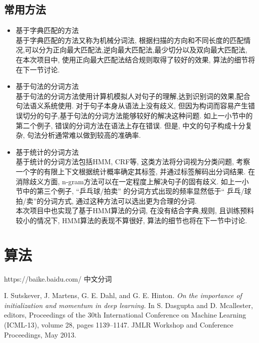 \documentclass[titlepage]{article}
\begin{document}
\subsection{常用方法}
\begin{itemize}
\item 基于字典匹配的方法\\[1em]
  基于字典匹配的方法又称为机械分词法, 根据扫描的方向和不同长度的匹配情况,可以分为正向最大匹配法,逆向最大匹配法,最少切分以及双向最大匹配法, 在本次项目中, 使用正向最大匹配法结合规则取得了较好的效果, 算法的细节将在下一节讨论.
\item 基于句法的分词方法\\[1em]
  基于句法的分词方法使用计算机模拟人对句子的理解,达到识别词的效果,配合句法语义系统使用. 对于句子本身从语法上没有歧义, 但因为构词而容易产生错误切分的句子,基于句法的分词方法能够较好的解决这种问题. 如上一小节中的第二个例子, 错误的分词方法在语法上存在错误. 但是, 中文的句子构成十分复杂, 句法分析通常难以做到较高的准确率.
\item 基于统计的分词方法\\[1em]
  基于统计的分词方法包括HMM, CRF等, 这类方法将分词视为分类问题, 考察一个字的有限上下文根据统计概率确定其标签, 并通过标签解码出分词结果. 在消除歧义方面, n-gram方法可以在一定程度上解决句子的固有歧义. 如上一小节中的第三个例子, ``乒乓球/拍卖'' 的分词方式出现的频率显然低于`` 乒乓/球拍/卖''的分词方式, 通过这种方法可以选出更为合理的分词. \\
  本次项目中也实现了基于HMM算法的分词, 在没有结合字典,规则, 且训练预料较小的情况下, HMM算法的表现不算很好, 算法的细节也将在下一节中讨论.

\end{itemize}


\section{算法}
\begin{thebibliography}{1}

     https://baike.baidu.com/ 中文分词
    
     I. Sutskever, J. Martens, G. E. Dahl, and G. E. Hinton. \textit{On the importance of initialization and momentum in deep learning.} In S. Dasgupta and D. Mcallester, editors, Proceedings of the 30th International Conference on Machine Learning (ICML-13), volume 28, pages 1139–1147. JMLR Workshop and Conference Proceedings, May 2013.

\end{thebibliography}
\end{document}
